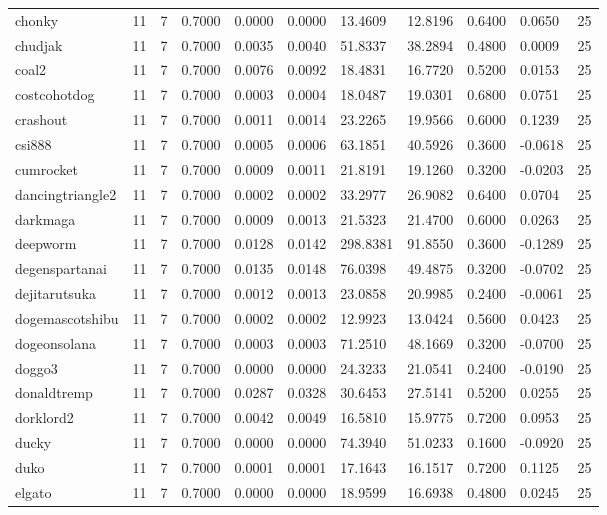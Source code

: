 \begin{table}[htbp]
\begin{tabular}{lllllllllll}
chonky & 11 & 7 & 0.7000 & 0.0000 & 0.0000 & 13.4609 & 12.8196 & 0.6400 & 0.0650 & 25 \\
chudjak & 11 & 7 & 0.7000 & 0.0035 & 0.0040 & 51.8337 & 38.2894 & 0.4800 & 0.0009 & 25 \\
coal2 & 11 & 7 & 0.7000 & 0.0076 & 0.0092 & 18.4831 & 16.7720 & 0.5200 & 0.0153 & 25 \\
costcohotdog & 11 & 7 & 0.7000 & 0.0003 & 0.0004 & 18.0487 & 19.0301 & 0.6800 & 0.0751 & 25 \\
crashout & 11 & 7 & 0.7000 & 0.0011 & 0.0014 & 23.2265 & 19.9566 & 0.6000 & 0.1239 & 25 \\
csi888 & 11 & 7 & 0.7000 & 0.0005 & 0.0006 & 63.1851 & 40.5926 & 0.3600 & -0.0618 & 25 \\
cumrocket & 11 & 7 & 0.7000 & 0.0009 & 0.0011 & 21.8191 & 19.1260 & 0.3200 & -0.0203 & 25 \\
dancingtriangle2 & 11 & 7 & 0.7000 & 0.0002 & 0.0002 & 33.2977 & 26.9082 & 0.6400 & 0.0704 & 25 \\
darkmaga & 11 & 7 & 0.7000 & 0.0009 & 0.0013 & 21.5323 & 21.4700 & 0.6000 & 0.0263 & 25 \\
deepworm & 11 & 7 & 0.7000 & 0.0128 & 0.0142 & 298.8381 & 91.8550 & 0.3600 & -0.1289 & 25 \\
degenspartanai & 11 & 7 & 0.7000 & 0.0135 & 0.0148 & 76.0398 & 49.4875 & 0.3200 & -0.0702 & 25 \\
dejitarutsuka & 11 & 7 & 0.7000 & 0.0012 & 0.0013 & 23.0858 & 20.9985 & 0.2400 & -0.0061 & 25 \\
dogemascotshibu & 11 & 7 & 0.7000 & 0.0002 & 0.0002 & 12.9923 & 13.0424 & 0.5600 & 0.0423 & 25 \\
dogeonsolana & 11 & 7 & 0.7000 & 0.0003 & 0.0003 & 71.2510 & 48.1669 & 0.3200 & -0.0700 & 25 \\
doggo3 & 11 & 7 & 0.7000 & 0.0000 & 0.0000 & 24.3233 & 21.0541 & 0.2400 & -0.0190 & 25 \\
donaldtremp & 11 & 7 & 0.7000 & 0.0287 & 0.0328 & 30.6453 & 27.5141 & 0.5200 & 0.0255 & 25 \\
dorklord2 & 11 & 7 & 0.7000 & 0.0042 & 0.0049 & 16.5810 & 15.9775 & 0.7200 & 0.0953 & 25 \\
ducky & 11 & 7 & 0.7000 & 0.0000 & 0.0000 & 74.3940 & 51.0233 & 0.1600 & -0.0920 & 25 \\
duko & 11 & 7 & 0.7000 & 0.0001 & 0.0001 & 17.1643 & 16.1517 & 0.7200 & 0.1125 & 25 \\
elgato & 11 & 7 & 0.7000 & 0.0000 & 0.0000 & 18.9599 & 16.6938 & 0.4800 & 0.0245 & 25 \\

\end{tabular}
\end{table}
